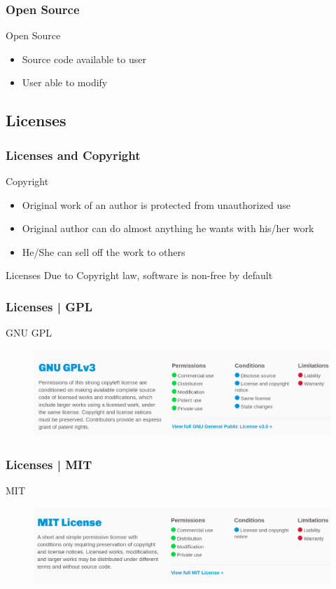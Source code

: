 \documentclass{beamer}
\begin{document}
\begin{frame}\frametitle{Open Source}
		\begin{block}{Open Source }
			\begin{itemize}
				\item Source code available to user
				\item User able to modify
			\end{itemize}
		\end{block}
\end{frame}

	\subsection{Licenses}
\begin{frame}
	\frametitle{Licenses and Copyright}
	\begin{block}{Copyright}
		\begin{itemize}
			\item Original work of an author is protected from unauthorized use
			\item Original author can do almost anything he wants with his/her work
			\item He/She can sell off the work to others
		\end{itemize}
		
	\end{block}
	
	\begin{block}{Licenses}
		Due to Copyright law, software is non-free by default 
	\end{block}
\end{frame}
\begin{frame} \frametitle{Licenses | GPL}
	\begin{block}{GNU GPL}
		\begin{figure}
			\includegraphics[scale =1]{gpl}
		\end{figure}
	\end{block}
\end{frame}
\begin{frame} \frametitle{Licenses | MIT}
	\begin{block}{MIT}
		\begin{figure}
			\includegraphics[scale =1]{mit}
		\end{figure}
	\end{block}
\end{frame}
\end{document}
